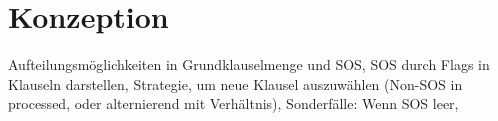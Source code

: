
\chapter{Konzeption}


Aufteilungsmöglichkeiten in Grundklauselmenge und SOS, SOS durch Flags in Klauseln darstellen, Strategie, um neue Klausel auszuwählen (Non-SOS in processed, oder alternierend mit Verhältnis),
Sonderfälle: Wenn SOS leer, 